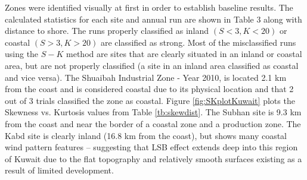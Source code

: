 Zones were identified visually at first in order to establish baseline results.  The calculated statistics for each site and annual run are shown in Table 3 along with distance to shore.  The runs properly classified as inland $(S < 3, K < 20)$ or coastal $(S > 3, K > 20)$ are classified as strong.   Most of the misclassified runs using the $S-K$ method are sites that are clearly situated in an inland or coastal area, but are not properly classified (a site in an inland area classified as coastal and vice versa).  The Shuaibah Industrial Zone - Year 2010, is located 2.1 km from the coast and is considered coastal due to its physical location and that 2 out of 3 trials classified the zone as coastal. Figure \ref{fig:SKplotKuwait} plots the Skewness vs. Kurtosis values from Table \ref{tb:skewdist}. The Subhan site is 9.3 km from the coast and near the border of a coastal zone and a production zone. The Kabd site is clearly inland (16.8 km from the coast), but shows many coastal wind pattern features – suggesting that LSB effect extends deep into this region of Kuwait due to the flat topography and relatively smooth surfaces existing as a result of limited development.
%
